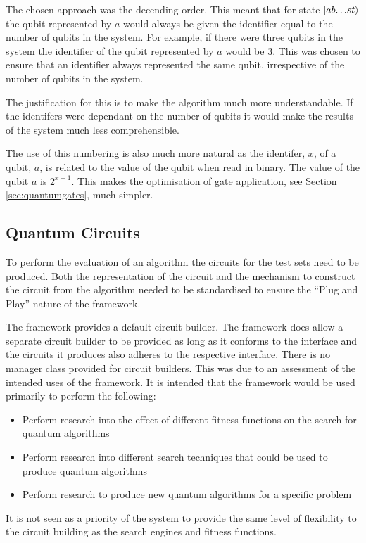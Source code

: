 The chosen approach was the decending order.
This meant that for state $\left\vert{ab{\dots}st}\right\rangle$ the qubit represented by $a$ would always be given the identifier equal to the number of qubits in the system.
For example, if there were three qubits in the system the identifier of the qubit represented by $a$ would be $3$.
This was chosen to ensure that an identifier always represented the same qubit, irrespective of the number of qubits in the system.

The justification for this is to make the algorithm much more understandable.
If the identifers were dependant on the number of qubits it would make the results of the system much less comprehensible.

The use of this numbering is also much more natural as the identifer, $x$, of a qubit, $a$, is related to the value of the qubit when read in binary.
The value of the qubit $a$ is $2^{x-1}$.
This makes the optimisation of gate application, see Section \ref{sec:quantumgates}, much simpler.

\subsection{Quantum Circuits}
To perform the evaluation of an algorithm the circuits for the test sets need to be produced.
Both the representation of the circuit and the mechanism to construct the circuit from the algorithm needed to be standardised to ensure the ``Plug and Play'' nature of the framework.

The framework provides a default circuit builder.
The framework does allow a separate circuit builder to be provided as long as it conforms to the interface and the circuits it produces also adheres to the respective interface.
There is no manager class provided for circuit builders.
This was due to an assessment of the intended uses of the framework.
It is intended that the framework would be used primarily to perform the following:
\begin{itemize}
  \item Perform research into the effect of different fitness functions on the search for quantum algorithms
  \item Perform research into different search techniques that could be used to produce quantum algorithms
  \item Perform research to produce new quantum algorithms for a specific problem
\end{itemize}

It is not seen as a priority of the system to provide the same level of flexibility to the circuit building as the search engines and fitness functions.

